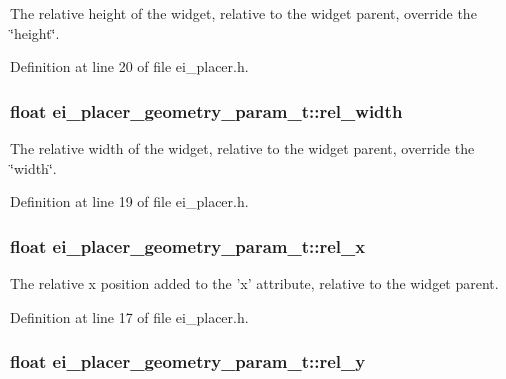 The relative height of the widget, relative to the widget parent, override the \char`\"{}height\char`\"{}. 



Definition at line 20 of file ei\+\_\+placer.\+h.

\hypertarget{structei__placer__geometry__param__t_a6db90e24dd410aba70d28601c4a45848}{
\subsubsection[{rel\+\_\+width}]{\setlength{\rightskip}{0pt plus 5cm}float ei\+\_\+placer\+\_\+geometry\+\_\+param\+\_\+t\+::rel\+\_\+width}}\label{structei__placer__geometry__param__t_a6db90e24dd410aba70d28601c4a45848}


The relative width of the widget, relative to the widget parent, override the \char`\"{}width\char`\"{}. 



Definition at line 19 of file ei\+\_\+placer.\+h.

\hypertarget{structei__placer__geometry__param__t_a7ef1944c9e941e32ecc97b06d93ccde2}{
\subsubsection[{rel\+\_\+x}]{\setlength{\rightskip}{0pt plus 5cm}float ei\+\_\+placer\+\_\+geometry\+\_\+param\+\_\+t\+::rel\+\_\+x}}\label{structei__placer__geometry__param__t_a7ef1944c9e941e32ecc97b06d93ccde2}


The relative x position added to the 'x' attribute, relative to the widget parent. 



Definition at line 17 of file ei\+\_\+placer.\+h.

\hypertarget{structei__placer__geometry__param__t_a0cf562b8ca4f89fc1cad3295597e281f}{
\subsubsection[{rel\+\_\+y}]{\setlength{\rightskip}{0pt plus 5cm}float ei\+\_\+placer\+\_\+geometry\+\_\+param\+\_\+t\+::rel\+\_\+y}}\label{structei__placer__geometry__param__t_a0cf562b8ca4f89fc1cad3295597e281f}


